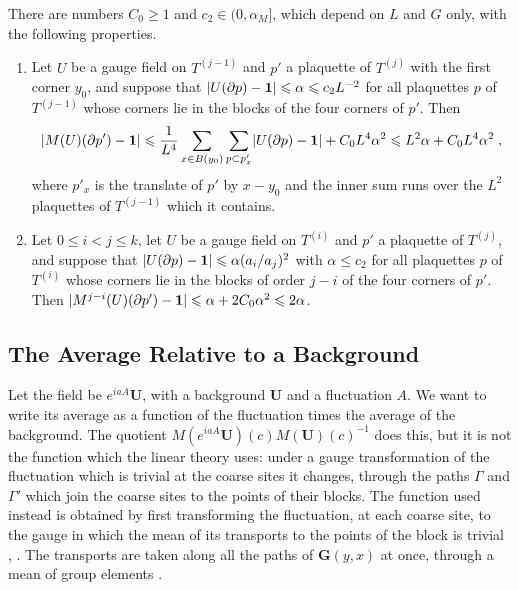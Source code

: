 \documentclass[11pt]{preprint}
\newcommand{\id}{\mathbf 1}
\DeclarePairedDelimiter{\abs}{\lvert}{\rvert}
\numberwithin{equation}{section}
\begin{document}
\begin{proposition}\label{prop:regular-averages}
There are numbers $C_0 \geqslant 1$ and $c_2 \in (0, \alpha_M]$, which depend on $L$ and $G$ only, with the following properties.
\begin{enumerate}[label=(\roman*)]
\item Let $U$ be a gauge field on $T^{(j-1)}$ and $p'$ a plaquette of $T^{(j)}$ with the first corner $y_0$, and suppose that $\abs{U(\partial p) - \id} \leqslant \alpha \leqslant c_2L^{-2}$ for all plaquettes $p$ of $T^{(j-1)}$ whose corners lie in the blocks of the four corners of $p'$. Then
\begin{equation}\label{eq:averaged-plaquette}
    \abs{M(U)(\partial p') - \id} \leqslant \frac{1}{L^4}\sum_{x \in B(y_0)}\sum_{p \subset p'_x}\abs{U(\partial p) - \id} + C_0L^4\alpha^2 \leqslant L^2\alpha + C_0L^4\alpha^2\;,
\end{equation}
where $p'_x$ is the translate of $p'$ by $x - y_0$ and the inner sum runs over the $L^2$ plaquettes of $T^{(j-1)}$ which it contains.
\item Let $0 \leqslant i < j \leqslant k$, let $U$ be a gauge field on $T^{(i)}$ and $p'$ a plaquette of $T^{(j)}$, and suppose that $\abs{U(\partial p) - \id} \leqslant \alpha(a_i/a_j)^2$ with $\alpha \leqslant c_2$ for all plaquettes $p$ of $T^{(i)}$ whose corners lie in the blocks of order $j - i$ of the four corners of $p'$. Then $\abs{M^{j-i}(U)(\partial p') - \id} \leqslant \alpha + 2C_0\alpha^2 \leqslant 2\alpha$.
\end{enumerate}
\end{proposition}

\subsection{The Average Relative to a Background}\label{sec:relative-average}

Let the field be $e^{iaA}\mathbf U$, with a background $\mathbf U$ and a fluctuation $A$. We want to write its average as a function of the fluctuation times the average of the background. The quotient $M(e^{iaA}\mathbf U)(c)M(\mathbf U)(c)^{-1}$ does this, but it is not the function which the linear theory uses: under a gauge transformation of the fluctuation which is trivial at the coarse sites it changes, through the paths $\Gamma$ and $\Gamma'$ which join the coarse sites to the points of their blocks. The function used instead is obtained by first transforming the fluctuation, at each coarse site, to the gauge in which the mean of its transports to the points of the block is trivial \cite[pp.~26--31]{BalabanAVG}, \cite[p.~418]{BalabanPBG}. The transports are taken along all the paths of $\mathbf G(y, x)$ at once, through a mean of group elements \cite[(0.5)--(0.11), p.~253]{BalabanRG1}.
\end{document}
